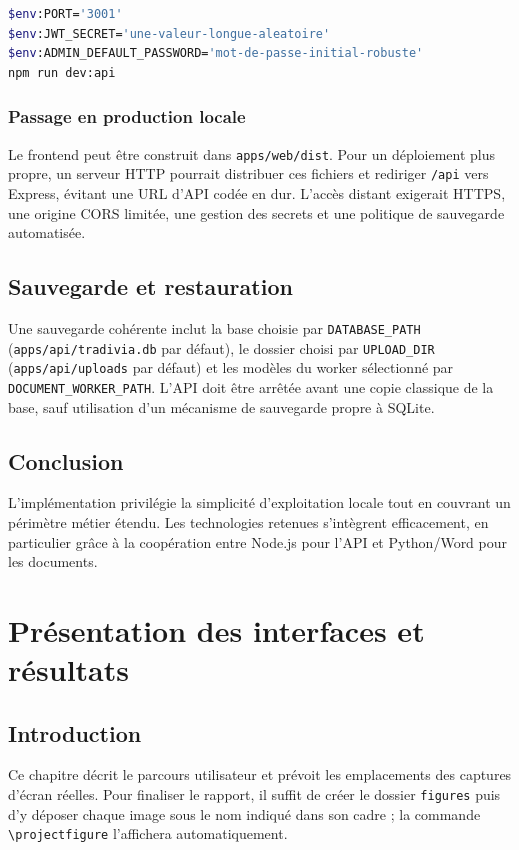 \documentclass[12pt,a4paper,oneside]{report}
\newcommand{\code}[1]{\texttt{#1}}
\begin{document}
\begin{lstlisting}[language=bash,caption={Exemple de configuration PowerShell}]
$env:PORT='3001'
$env:JWT_SECRET='une-valeur-longue-aleatoire'
$env:ADMIN_DEFAULT_PASSWORD='mot-de-passe-initial-robuste'
npm run dev:api
\end{lstlisting}

\subsection{Passage en production locale}
Le frontend peut être construit dans \code{apps/web/dist}. Pour un déploiement plus propre, un serveur HTTP pourrait distribuer ces fichiers et rediriger \code{/api} vers Express, évitant une URL d'API codée en dur. L'accès distant exigerait HTTPS, une origine CORS limitée, une gestion des secrets et une politique de sauvegarde automatisée.

\section{Sauvegarde et restauration}
Une sauvegarde cohérente inclut la base choisie par \code{DATABASE\_PATH} (\code{apps/api/tradivia.db} par défaut), le dossier choisi par \code{UPLOAD\_DIR} (\code{apps/api/uploads} par défaut) et les modèles du worker sélectionné par \code{DOCUMENT\_WORKER\_PATH}. L'API doit être arrêtée avant une copie classique de la base, sauf utilisation d'un mécanisme de sauvegarde propre à SQLite.

\section*{Conclusion}
L'implémentation privilégie la simplicité d'exploitation locale tout en couvrant un périmètre métier étendu. Les technologies retenues s'intègrent efficacement, en particulier grâce à la coopération entre Node.js pour l'API et Python/Word pour les documents.

\chapter{Présentation des interfaces et résultats}
\section*{Introduction}
Ce chapitre décrit le parcours utilisateur et prévoit les emplacements des captures d'écran réelles. Pour finaliser le rapport, il suffit de créer le dossier \code{figures} puis d'y déposer chaque image sous le nom indiqué dans son cadre ; la commande \code{\textbackslash projectfigure} l'affichera automatiquement.
\end{document}
